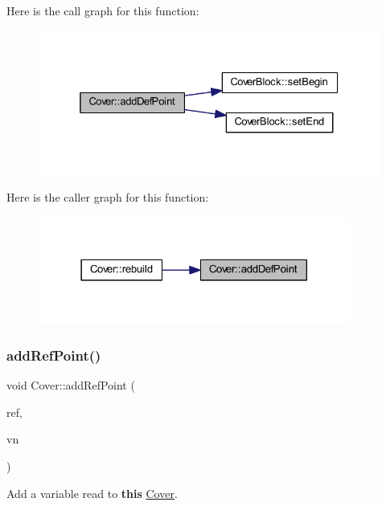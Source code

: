 Here is the call graph for this function\+:
\nopagebreak
\begin{figure}[H]
\begin{center}
\leavevmode
\includegraphics[width=325pt]{class_cover_a462cc65e034e09963b612d1d3b1faa31_cgraph}
\end{center}
\end{figure}
Here is the caller graph for this function\+:
\nopagebreak
\begin{figure}[H]
\begin{center}
\leavevmode
\includegraphics[width=290pt]{class_cover_a462cc65e034e09963b612d1d3b1faa31_icgraph}
\end{center}
\end{figure}
\mbox{\label{class_cover_ab456608e95995c8005aeac877fdac731}} 
\subsubsection{\texorpdfstring{addRefPoint()}{addRefPoint()}}
{\footnotesize\ttfamily void Cover\+::add\+Ref\+Point (\begin{DoxyParamCaption}\item[{const \mbox{\hyperlink{class_pcode_op}{Pcode\+Op}} $\ast$}]{ref,  }\item[{const \mbox{\hyperlink{class_varnode}{Varnode}} $\ast$}]{vn }\end{DoxyParamCaption})}



Add a variable read to {\bfseries{this}} \mbox{\hyperlink{class_cover}{Cover}}. 

